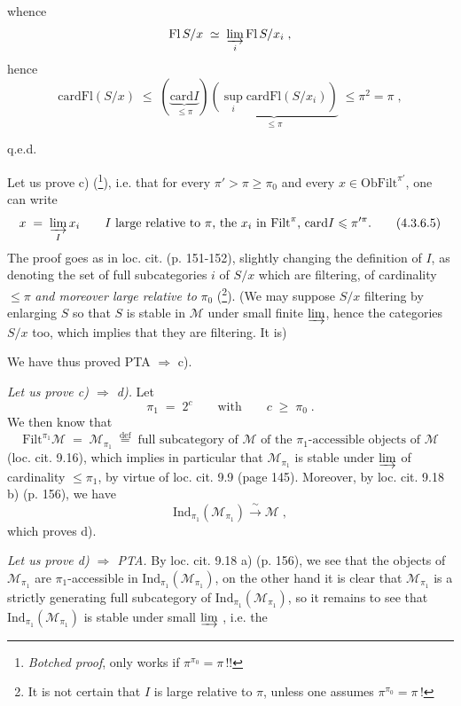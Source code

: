 \documentclass[11pt]{article}
\newcommand{\printedpage}[1]{\marginpar{\footnotesize p.~#1}}
\newcommand{\msp}[1]{\marginpar{\footnotesize [#1]}}
\newcommand{\Ind}{\mathrm{Ind}}
\newcommand{\card}{\mathrm{card}}
\newcommand{\Fl}{\mathrm{Fl}}
\newcommand{\Ob}{\mathrm{Ob}}
\newcommand{\Filt}{\mathrm{Filt}}
\begin{document}
\setcounter{footnote}{11}

\printedpage{14}

whence
\[
\Fl\,S/x \;\simeq\; \varinjlim_{i} \Fl\,S/x_i \;,
\]
hence
\[
\card\Fl(S/x) \;\leqslant\; (\underbrace{\card I}_{\leqslant\pi})\underbrace{(\sup_{i}\card\Fl(S/x_i))}_{\leqslant\pi} \;\leqslant \pi^2 = \pi \;,
\]

\hfill q.e.d.

\msp{page 76}
Let us prove c) (\footnote{\textit{Botched proof}, only works if $\pi^{\pi_0} = \pi$\,!!}), i.e. that for every $\pi' > \pi \geqslant \pi_0$ and every $x \in \Ob\Filt^{\pi'}$, one can write
\[
x \;=\; \varinjlim_{I} x_i \qquad I \text{ large relative to } \pi\text{, the } x_i \text{ in } \Filt^{\pi}\text{, } \card I \leqslant \pi'^{\pi}. \tag*{(4.3.6.5)}
\]
The proof goes as in loc. cit. (p. 151-152), slightly changing the definition of $I$, as denoting the set of full subcategories $i$ of $S/x$ which are filtering, of cardinality $\leqslant \pi$ \textit{and moreover large relative to} $\pi_0$ (\footnote{It is not certain that $I$ is large relative to $\pi$, unless one assumes $\pi^{\pi_0} = \pi$\,!}). (We may suppose $S/x$ filtering by enlarging $S$ so that $S$ is stable in $\mathcal{M}$ under small finite $\varinjlim$, hence the categories $S/x$ too, which implies that they are filtering. It is)

We have thus proved PTA $\Longrightarrow$ c).

\textit{Let us prove c) $\Longrightarrow$ d).} Let
\[
\pi_1 \;=\; 2^c \qquad \text{with} \qquad c \;\geqslant\; \pi_0 \;.
\]
We then know that
\[
\Filt^{\pi_1}\mathcal{M} \;=\; \mathcal{M}_{\pi_1} \;\overset{\text{def}}{=}\; \text{full subcategory of $\mathcal{M}$ of the $\pi_1$-accessible objects of $\mathcal{M}$}
\]
(loc. cit. 9.16), which implies in particular that $\mathcal{M}_{\pi_1}$ is stable under $\varinjlim$ of cardinality $\leqslant \pi_1$, by virtue of loc. cit. 9.9 (page 145). Moreover,
\msp{page 77}
by loc. cit. 9.18 b) (p. 156), we have
\[
\Ind_{\pi_1}(\mathcal{M}_{\pi_1}) \xrightarrow{\;\sim\;} \mathcal{M} \;,
\]
which proves d).

\textit{Let us prove d) $\Longrightarrow$ PTA.} By loc. cit. 9.18 a) (p. 156), we see that the objects of $\mathcal{M}_{\pi_1}$ are $\pi_1$-accessible in $\Ind_{\pi_1}(\mathcal{M}_{\pi_1})$, on the other hand it is clear that $\mathcal{M}_{\pi_1}$ is a strictly generating full subcategory of $\Ind_{\pi_1}(\mathcal{M}_{\pi_1})$, so it remains to see that $\Ind_{\pi_1}(\mathcal{M}_{\pi_1})$ is stable under small $\varinjlim$ , i.e. the
\end{document}
